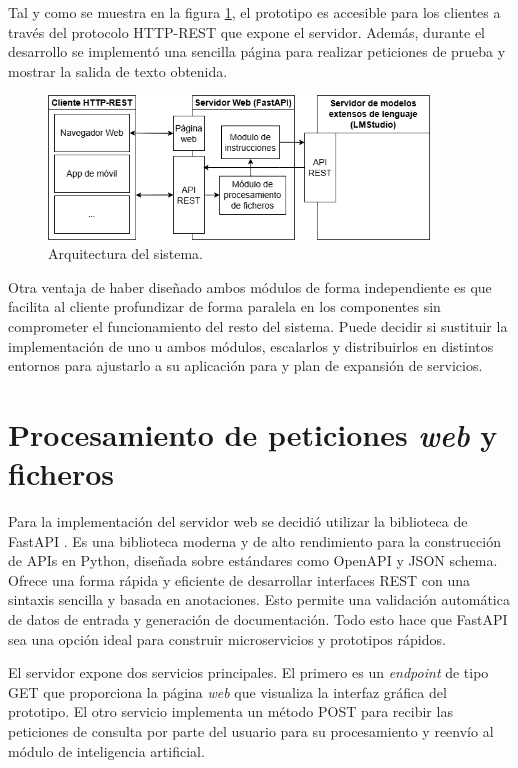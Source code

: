 Tal y como se muestra en la figura \ref{fig:sist},
el prototipo es accesible para los clientes a través del protocolo HTTP-REST que expone el servidor.
Además, durante el desarrollo se implementó una sencilla página  para realizar peticiones de prueba
y mostrar la salida de texto obtenida.

\begin{figure}[htbp]
	\centering
	\includegraphics[width=0.9\textwidth]{./Figures/Sistema_es.png}
	\caption{Arquitectura del sistema.}
	\label{fig:sist}
\end{figure}

Otra ventaja de haber diseñado ambos módulos de forma independiente es que facilita al cliente
profundizar de forma paralela en los componentes sin comprometer el funcionamiento del resto del sistema.
Puede decidir si sustituir la implementación de uno u ambos módulos, escalarlos y distribuirlos en distintos entornos
para ajustarlo a su aplicación para  y plan de expansión de servicios. 

\section{Procesamiento de peticiones \textit{web} y ficheros}
Para la implementación del servidor web se decidió utilizar la biblioteca de FastAPI \cite{fastapi}.
Es una biblioteca moderna y de alto rendimiento para la construcción de APIs  en Python,
diseñada sobre estándares como OpenAPI \cite{openapi} y JSON schema.
Ofrece una forma rápida y eficiente de desarrollar interfaces REST
con una sintaxis sencilla y basada en anotaciones.
Esto permite una validación automática de datos de entrada y generación de documentación.
Todo esto hace que FastAPI sea una opción ideal para construir microservicios y prototipos rápidos.

El servidor expone dos servicios principales.
El primero es un \textit{endpoint} de tipo GET que proporciona la página \textit{web} que visualiza la interfaz gráfica del prototipo.
El otro servicio implementa un método POST para recibir las peticiones de consulta por parte del usuario para su procesamiento
y reenvío al módulo de inteligencia artificial. 


